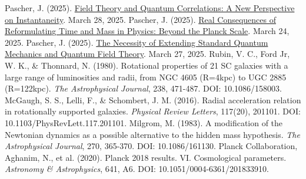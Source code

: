 \documentclass[12pt,a4paper]{article}
\begin{document}
\begin{thebibliography}{99}
		 Pascher, J. (2025). \href{https://github.com/jpascher/T0-Time-Mass-Duality/tree/main/2/pdf/English/FeldtheorieQuantenEn.pdf}{Field Theory and Quantum Correlations: A New Perspective on Instantaneity}. March 28, 2025.
		 Pascher, J. (2025). \href{https://github.com/jpascher/T0-Time-Mass-Duality/tree/main/2/pdf/English/JenseitsPlanckEn.pdf}{Real Consequences of Reformulating Time and Mass in Physics: Beyond the Planck Scale}. March 24, 2025.
		 Pascher, J. (2025). \href{https://github.com/jpascher/T0-Time-Mass-Duality/tree/main/2/pdf/English/NotwendigkeitQMErweiterungEn.pdf}{The Necessity of Extending Standard Quantum Mechanics and Quantum Field Theory}. March 27, 2025.
		 Rubin, V. C., Ford Jr, W. K., \& Thonnard, N. (1980). Rotational properties of 21 SC galaxies with a large range of luminosities and radii, from NGC 4605 (R=4kpc) to UGC 2885 (R=122kpc). \textit{The Astrophysical Journal}, 238, 471-487. DOI: 10.1086/158003.
		 McGaugh, S. S., Lelli, F., \& Schombert, J. M. (2016). Radial acceleration relation in rotationally supported galaxies. \textit{Physical Review Letters}, 117(20), 201101. DOI: 10.1103/PhysRevLett.117.201101.
		 Milgrom, M. (1983). A modification of the Newtonian dynamics as a possible alternative to the hidden mass hypothesis. \textit{The Astrophysical Journal}, 270, 365-370. DOI: 10.1086/161130.
		 Planck Collaboration, Aghanim, N., et al. (2020). Planck 2018 results. VI. Cosmological parameters. \textit{Astronomy \& Astrophysics}, 641, A6. DOI: 10.1051/0004-6361/201833910.
	\end{thebibliography}
	
\end{document}

